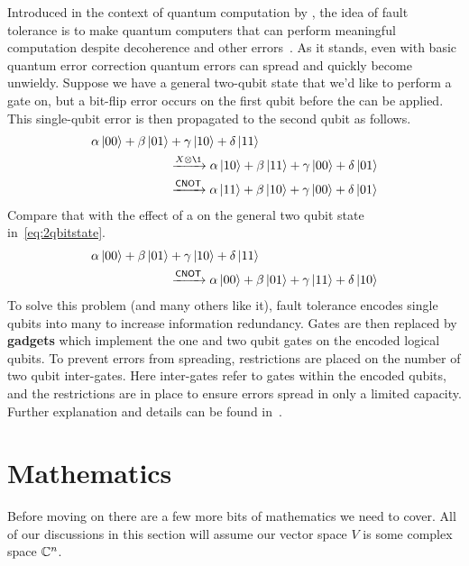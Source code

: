 Introduced in the context of quantum computation by \citeauthor{fault-tolerance}, the idea of fault tolerance is to make quantum computers that can perform meaningful computation despite decoherence and other errors~\cite{fault-tolerance}.
As it stands, even with basic quantum error correction quantum errors can spread and quickly become unwieldy.
Suppose we have a general two-qubit state that we'd like to perform a \CNOT{} gate on, but a bit-flip error occurs on the first qubit before the \CNOT{} can be applied.
This single-qubit error is then propagated to the second qubit as follows.
\begin{align}
    \alpha\ket{00} + \beta\ket{01} & + \gamma\ket{10} + \delta\ket{11} \label{eq:2qbitstate}                                     \\
                                   & \xrightarrow{X \otimes \1} \alpha\ket{10} + \beta\ket{11} + \gamma\ket{00} + \delta\ket{01} \\
                                   & \xrightarrow{\CNOT{}} \alpha\ket{11} + \beta\ket{10} + \gamma\ket{00} + \delta\ket{01}
\end{align}
Compare that with the effect of a \CNOT{} on the general two qubit state in~\cref{eq:2qbitstate}.
\begin{align}
    \alpha\ket{00} + \beta\ket{01} & + \gamma\ket{10} + \delta\ket{11}                                                      \\
                                   & \xrightarrow{\mathsf{CNOT}{}} \alpha\ket{00} + \beta\ket{01} + \gamma\ket{11} + \delta\ket{10}
\end{align}
To solve this problem (and many others like it), fault tolerance encodes single qubits into many to increase information redundancy.
Gates are then replaced by \textbf{gadgets} which implement the one and two qubit gates on the encoded logical qubits.
To prevent errors from spreading, restrictions are placed on the number of two qubit inter-gates.
Here inter-gates refer to gates within the encoded qubits, and the restrictions are in place to ensure errors spread in only a limited capacity.
Further explanation and details can be found in~\cite{intro-ft}.

\section{Mathematics}

Before moving on there are a few more bits of mathematics we need to cover.
All of our discussions in this section will assume our vector space $V$ is some complex space $\mathbb{C}^n$.

